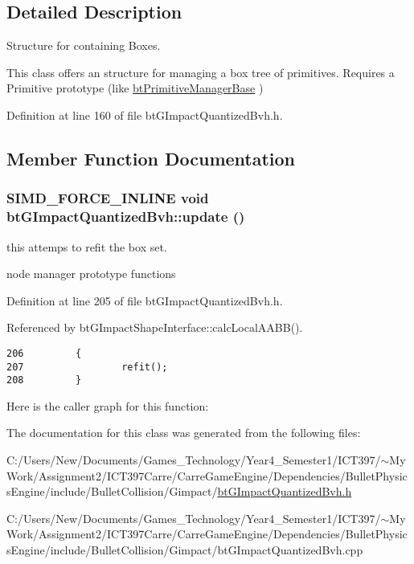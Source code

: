 \subsection{Detailed Description}
Structure for containing Boxes. 

This class offers an structure for managing a box tree of primitives. Requires a Primitive prototype (like \hyperlink{classbt_primitive_manager_base}{btPrimitiveManagerBase} ) 

Definition at line 160 of file btGImpactQuantizedBvh.h.

\subsection{Member Function Documentation}
\hypertarget{classbt_g_impact_quantized_bvh_71665f5245b8f7de1c54f107ef262cd0}{
\subsubsection[update]{\setlength{\rightskip}{0pt plus 5cm}SIMD\_\-FORCE\_\-INLINE void btGImpactQuantizedBvh::update ()}}
\label{classbt_g_impact_quantized_bvh_71665f5245b8f7de1c54f107ef262cd0}


this attemps to refit the box set. 

node manager prototype functions 

Definition at line 205 of file btGImpactQuantizedBvh.h.

Referenced by btGImpactShapeInterface::calcLocalAABB().

\begin{Code}\begin{verbatim}206         {
207                 refit();
208         }
\end{verbatim}
\end{Code}




Here is the caller graph for this function:

The documentation for this class was generated from the following files:\begin{CompactItemize}
\item 
C:/Users/New/Documents/Games\_\-Technology/Year4\_\-Semester1/ICT397/$\sim$My Work/Assignment2/ICT397Carre/CarreGameEngine/Dependencies/BulletPhysicsEngine/include/BulletCollision/Gimpact/\hyperlink{bt_g_impact_quantized_bvh_8h}{btGImpactQuantizedBvh.h}\item 
C:/Users/New/Documents/Games\_\-Technology/Year4\_\-Semester1/ICT397/$\sim$My Work/Assignment2/ICT397Carre/CarreGameEngine/Dependencies/BulletPhysicsEngine/include/BulletCollision/Gimpact/btGImpactQuantizedBvh.cpp\end{CompactItemize}
